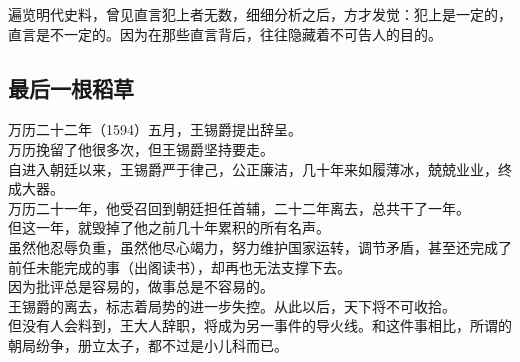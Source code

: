 \begin{multicols}{\theparacolNo}
遍览明代史料，曾见直言犯上者无数，细细分析之后，方才发觉：犯上是一定的，直言是不一定的。因为在那些直言背后，往往隐藏着不可告人的目的。\\

\subsection{最后一根稻草}
万历二十二年（1594）五月，王锡爵提出辞呈。\\

万历挽留了他很多次，但王锡爵坚持要走。\\

自进入朝廷以来，王锡爵严于律己，公正廉洁，几十年来如履薄冰，兢兢业业，终成大器。\\

万历二十一年，他受召回到朝廷担任首辅，二十二年离去，总共干了一年。\\

但这一年，就毁掉了他之前几十年累积的所有名声。\\

虽然他忍辱负重，虽然他尽心竭力，努力维护国家运转，调节矛盾，甚至还完成了前任未能完成的事（出阁读书），却再也无法支撑下去。\\

因为批评总是容易的，做事总是不容易的。\\

王锡爵的离去，标志着局势的进一步失控。从此以后，天下将不可收拾。\\

但没有人会料到，王大人辞职，将成为另一事件的导火线。和这件事相比，所谓的朝局纷争，册立太子，都不过是小儿科而已。\\
\ifnum{}
	\end{multicols}
\fi
\newpage
